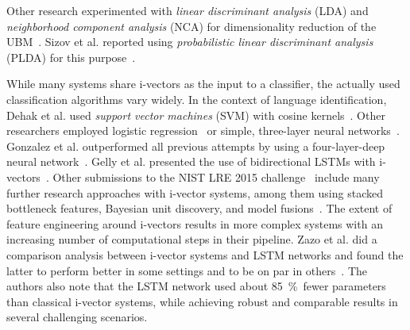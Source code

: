Other research experimented with \emph{linear discriminant analysis} (LDA) and \emph{neighborhood component analysis} (NCA) for dimensionality reduction of the UBM~\cite{dehak2011front}. Sizov et al. reported using \emph{probabilistic linear discriminant analysis} (PLDA) for this purpose~\cite{sizov2016discriminating}.

While many systems share i-vectors as the input to a classifier, the actually used classification algorithms vary widely. In the context of language identification, Dehak et al. used \emph{support vector machines} (SVM) with cosine kernels~\cite{dehak2011front}. Other researchers employed logistic regression~\cite{martinez2011language} or simple, three-layer neural networks~\cite{plchot2016bat}. Gonzalez et al. outperformed all previous attempts by using a four-layer-deep neural network~\cite{gonzalez2015frame}. Gelly et al. presented the use of bidirectional LSTMs with i-vectors~\cite{gelly2016language}. Other submissions to the NIST LRE 2015 challenge~\cite{lre2015} include many further research approaches with i-vector systems, among them using stacked bottleneck features, Bayesian unit discovery, and model fusions~\cite{lee20162015, torres2008mitll, ng2016sheffield}. The extent of feature engineering around i-vectors results in more complex systems with an increasing number of computational steps in their pipeline. Zazo et al. did a comparison analysis between i-vector systems and LSTM networks and found the latter to perform better in some settings and to be on par in others~\cite{zazo2016evaluation}. The authors also note that the LSTM network used about \SI{85}{\percent}~fewer parameters than classical i-vector systems, while achieving robust and comparable results in several challenging scenarios.

